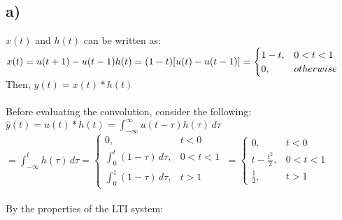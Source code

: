 \documentclass[12pt]{article}
\begin{document}
    \subsection*{a)}
	\(x(t)\) and \(h(t)\) can be written as: \\
    \begin{math}
      x(t) = u(t+1)-u(t-1) \\
      h(t) =  (1-t)[u(t)-u(t-1)] = \begin{cases}
      1-t,& 0<t<1 \\
      0,& otherwise
    \end{cases} \end{math}\\
      Then, \begin{math}y(t) = x(t)*h(t) \end{math}\\ \\
      Before evaluating the convolution, consider the following: \\
     \begin{math} \hat{y}(t) = u(t)*h(t) = \int_{-\infty}^{\infty} u(t-\tau)h(\tau) \,d\tau \end{math} \\
     \begin{math}  = \int_{-\infty}^{t} h(\tau) \,d\tau = \begin{cases}
      0,& t < 0\\
      \int_{0}^{t} (1-\tau) \,d\tau,& 0 < t < 1\\
     \int_{0}^{1} (1-\tau) \,d\tau,& t > 1
    \end{cases} \ =   \begin{cases}
      0,& t < 0\\
      t - \frac{t^{2}}{2} ,& 0 < t < 1\\
     \frac{1}{2},& t > 1
    \end{cases}  \end{math} \\ \\
    By the properties of the LTI system: \\ 
\end{document}
